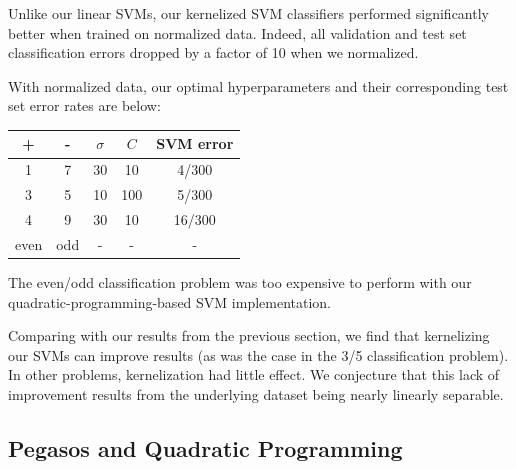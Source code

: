 \documentclass{article}
\begin{document}
\begin{multicols}{2}
Unlike our linear SVMs,
our kernelized SVM classifiers performed significantly better
when trained on normalized data.
Indeed, all validation and test set classification errors dropped by a factor of 10
when we normalized.

With normalized data, our optimal hyperparameters
and their corresponding test set error rates are below:
\begin{center}
\begin{tabular}{|c|c|c|c|c|}
\hline
+ & - & $\sigma$ & $C$ & SVM error \\\hline
1 & 7 &30 & 10 & 4/300 \\
3 & 5 &10 & 100 & 5/300\\
4 & 9 & 30 & 10 & 16/300\\
even & odd & - & - & - \\\hline
\end{tabular}
\end{center}
The even/odd classification problem was
too expensive to perform
with our quadratic-programming-based SVM implementation.

Comparing with our results from the previous section,
we find that kernelizing our SVMs can improve results
(as was the case in the 3/5 classification problem).
In other problems, kernelization had little effect.
We conjecture that this lack of improvement results from
the underlying dataset being nearly linearly separable.


\subsection{Pegasos and Quadratic Programming}













\end{multicols}
\end{document}
